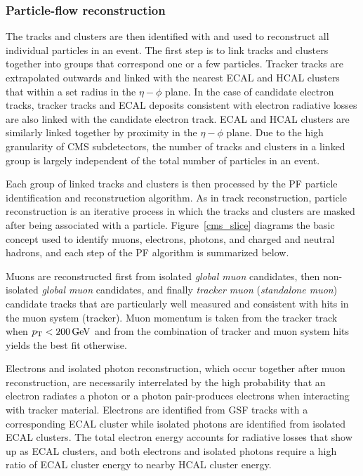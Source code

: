 \subsubsection{Particle-flow reconstruction}
The tracks and clusters are then identified with and used to reconstruct all individual particles in an event. The first step is to link tracks and clusters together into groups that correspond one or a few particles. Tracker tracks are extrapolated outwards and linked with the nearest ECAL and HCAL clusters that within a set radius in the $\eta-\phi$ plane. In the case of candidate electron tracks, tracker tracks and ECAL deposits consistent with electron radiative losses are also linked with the candidate electron track. ECAL and HCAL clusters are similarly linked together by proximity in the $\eta-\phi$ plane. Due to the high granularity of CMS subdetectors, the number of tracks and clusters in a linked group is largely independent of the total number of particles in an event.

Each group of linked tracks and clusters is then processed by the PF particle identification and reconstruction algorithm. As in track reconstruction, particle reconstruction is an iterative process in which the tracks and clusters are masked after being associated with a particle. Figure~\ref{cms_slice} diagrams the basic concept used to identify muons, electrons, photons, and charged and neutral hadrons, and each step of the PF algorithm is summarized below.

Muons are reconstructed first from isolated \textit{global muon} candidates, then non-isolated \textit{global muon} candidates, and finally \textit{tracker muon} (\textit{standalone muon}) candidate tracks that are particularly well measured and consistent with hits in the muon system (tracker). Muon momentum is taken from the tracker track when $\pt<\SI{200}{\GeV}$ and from the combination of tracker and muon system hits yields the best fit otherwise.

Electrons and isolated photon reconstruction, which occur together after muon reconstruction, are necessarily interrelated by the high probability that an electron radiates a photon or a photon pair-produces electrons when interacting with tracker material. Electrons are identified from GSF tracks with a corresponding ECAL cluster while isolated photons are identified from isolated ECAL clusters. The total electron energy accounts for radiative losses that show up as ECAL clusters, and both electrons and isolated photons require a high ratio of ECAL cluster energy to nearby HCAL cluster energy.

